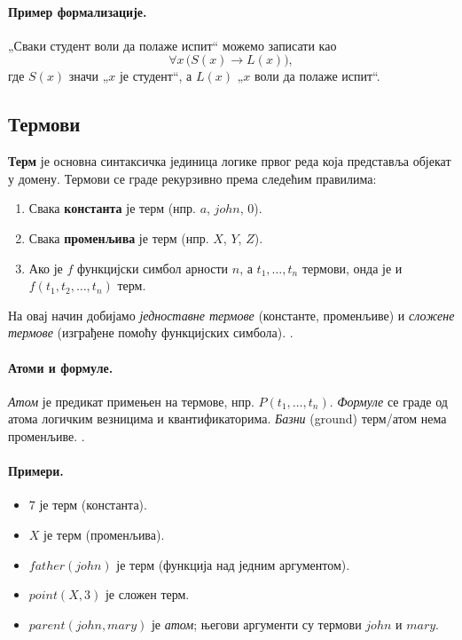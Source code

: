 \paragraph{Пример формализације.} „Сваки студент воли да полаже испит“ можемо записати као
\[
\forall x\,\big(S(x)\rightarrow L(x)\big),
\]
где $S(x)$ значи „$x$ је студент“, а $L(x)$ „$x$ воли да полаже испит“.

\subsection{Термови}
\textbf{Терм} је основна синтаксичка јединица логике првог реда која представља објекат у домену. 
Термови се граде рекурзивно према следећим правилима:
\begin{enumerate}
  \item Свака \textbf{константа} је терм (нпр. $a$, $john$, $0$).
  \item Свака \textbf{променљива} је терм (нпр. $X$, $Y$, $Z$).
  \item Ако је $f$ функцијски симбол арности $n$, а $t_1,\dots,t_n$ термови, онда је и\\
  \(
  f(t_1, t_2, \dots, t_n)
  \)
  терм.
\end{enumerate}
\noindent На овај начин добијамо \emph{једноставне термове} (константе, променљиве) и \emph{сложене термове} (изграђене помоћу функцијских симбола). \cite{janii_2004_matematika}.

\paragraph{Атоми и формуле.}
\emph{Атом} је предикат примењен на термове, нпр. $P(t_1,\dots,t_n)$. \emph{Формуле} се граде од атома логичким везницима и квантификаторима. \emph{Базни} (ground) терм/атом нема променљиве. \cite{janii_2004_matematika}.

\paragraph{Примери.}
\begin{itemize}
  \item $7$ је терм (константа).  
  \item $X$ је терм (променљива).  
  \item $father(john)$ је терм (функција над једним аргументом).  
  \item $point(X,3)$ је сложен терм.  
  \item $parent(john,mary)$ је \emph{атом}; његови аргументи су термови $john$ и $mary$.
\end{itemize}

